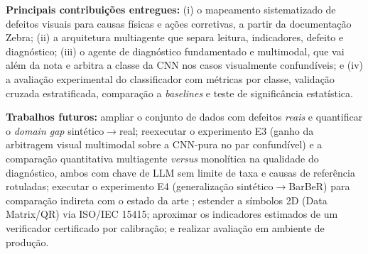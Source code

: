 \documentclass[
	article,			%
	11pt,				%
	oneside,			%
	a4paper,			%
	english,			%
	brazilian,			%
	sumario=tradicional
	]{abntex2}
\begin{document}
\noindent\textbf{Principais contribuições entregues:} (i) o mapeamento
sistematizado de defeitos visuais para causas físicas e ações corretivas, a partir
da documentação Zebra; (ii) a arquitetura multiagente que separa leitura,
indicadores, defeito e diagnóstico; (iii) o agente de diagnóstico fundamentado e
multimodal, que vai além da nota e arbitra a classe da CNN nos casos visualmente
confundíveis; e (iv) a avaliação experimental do classificador com métricas por
classe, validação cruzada estratificada, comparação a \textit{baselines} e teste de
significância estatística.

\noindent\textbf{Trabalhos futuros:} ampliar o conjunto de dados com defeitos
\emph{reais} e quantificar o \textit{domain gap} sintético$\rightarrow$real;
reexecutar o experimento E3 (ganho da arbitragem visual multimodal sobre a CNN-pura no
par confundível) e a comparação quantitativa multiagente \textit{versus} monolítica na
qualidade do diagnóstico, ambos com chave de LLM sem limite de taxa e causas de
referência rotuladas;
executar o experimento E4 (generalização sintético$\rightarrow$BarBeR) para
comparação indireta com o estado da arte \cite{duan2025barcode};
estender a símbolos 2D (Data Matrix/QR) via ISO/IEC 15415; aproximar os indicadores
estimados de um verificador certificado por calibração; e realizar avaliação em
ambiente de produção.

\postextual


\end{document}
